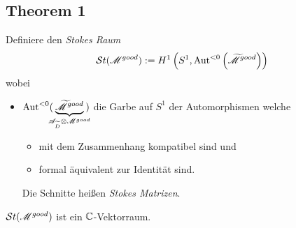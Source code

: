\begin{comment}
Definiere
\[
  \Syst(A^0):=\left\{A \mid A=\hat F[A^0]\text{ für ein }\hat F\in\hat G
    :=\GL_n(\C\llbracket t\rrbracket)\right\}
\]
\begin{center}
  \textbf{Wir sind interessiert in $\Syst(A^0)/G\{t\}$.}
\end{center}
wobei $G\{t\}:=\GL_n(\C\{t\})$ \emph{lokale analytischen Gauge
Tranformationen}
\begin{itemize}
  \item mit Wirkung $F[A^0]=(dF)F^{-1}+FA^0F^{-1}$.
    \marginnote{\tiny see \cite{sabbah2007isomonodromic} II.2.a}
\end{itemize}
Wir benötigen aber den etwas größeren Raum
\[
  \widehat\Syst(A^0):=
    \left\{(A,\hat F)\in\Syst(A^0)\times\hat G\mid A=\hat F[A^0]\right\}
\]
und damit
\begin{paracol}{5}
  $\cH(A^0):=\widehat\Syst(A^0)/G\{t\}$
\switchcolumn
\switchcolumn
  $\sH(\sM^{good}):=\left\{(\sM,\nabla,\hat f)
      \mid \hat f:(\sM,\nabla)\overset{\cong}\to(\sM^{good},\nabla^{good})
    \right\}/\sim$
\end{paracol}
\TODO[ist $\cH(A^0)$ der Halm bei $0$ von $\sH(\sM^{good})$?]
\end{comment}

\subsection{Theorem 1} %
\begin{defn}
  Definiere den \emph{Stokes Raum}
  \[
    \mathcal{S}{}t(\mathscr{M}^{good})
      :=H^1\left(S^1,\operatorname{Aut}^{<0}\left(\widetilde {\mathscr{M}}^{good}\right)\right)
  \]
  wobei
  \begin{itemize}
    \item $\operatorname{Aut}^{<0}(\!\!\!\underset{\mathscr{A}_{\widetilde D}\otimes\mathscr{M}^{good}}
      {\underbrace{\widetilde{\mathscr{M}}^{good}}}\!\!\!)$
      die Garbe auf $S^1$ der Automorphismen welche
      \begin{itemize}
        \item mit dem Zusammenhang kompatibel sind und
        \item formal äquivalent zur Identität sind.
      \end{itemize}
      Die Schnitte heißen \emph{Stokes Matrizen}.
  \end{itemize}
  \begin{thm}
    $\mathcal{S}{}t(\mathscr{M}^{good})$ ist ein $\mathbb{C}$-Vektorraum.
  \end{thm}
\end{defn}

